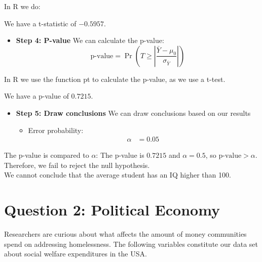 \documentclass[12pt,letterpaper]{article}
\begin{document}
\begin{enumerate}
		In R we do:
		
		
		We have a t-statistic of \(-0.5957\).
		\begin{itemize}
			\item \textbf{Step 4: P-value} We can calculate the p-value:
			 \[
			\text{p-value} = \Pr\left(T \geq \left|\frac{\bar{Y} - \mu_0}{\sigma_{\bar{Y}}}\right|\right)
			\]
		\end{itemize}
		
		In R we use the function pt to calculate the p-value, as we use a t-test.
		
		
		We have a p-value of \(0.7215\).
		
		\begin{itemize}
			\item \textbf{Step 5: Draw conclusions} We can draw conclusions based on our results
			\begin{itemize}
				\item Error probability:
				\begin{align*}
					\alpha &= 0.05 \
				\end{align*}
			\end{itemize}
		\end{itemize}

		The p-value is compared to \(\alpha\): The p-value is \(0.7215\) and \(\alpha = 0.5\), so \( \text{p-value} > \alpha \). 
		Therefore, we fail to reject the null hypothesis.\\
		We cannot conclude that the average student has an IQ higher than 100.	
	\end{enumerate}
	
	\newpage
	
	\section*{Question 2: Political Economy}
	
	\noindent Researchers are curious about what affects the amount of money communities spend on addressing homelessness. The following variables constitute our data set about social welfare expenditures in the USA. \\
	\vspace{.5cm}
	
\end{document}
